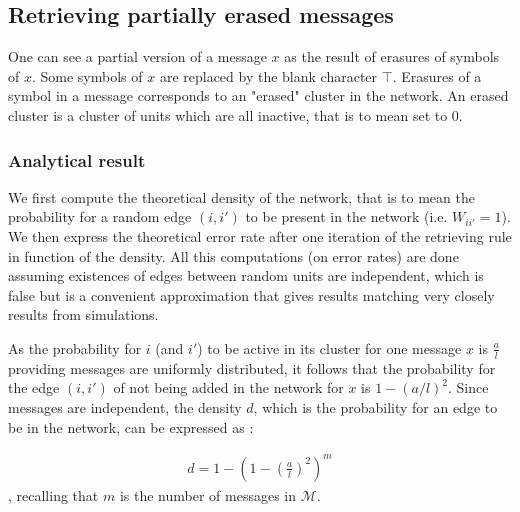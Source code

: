 \documentclass[english,10pt,twocolumn]{IEEEtran}
\theoremstyle{definition}
\begin{document}
	\subsection{Retrieving partially erased messages}		
		
	One can see a partial version of a message $x$ as the result of erasures of symbols of $x$. Some symbols of $x$ are replaced by the blank character $\intercal$.	Erasures of a symbol in a message corresponds to an "erased" cluster in the network. An erased cluster is a cluster of units which are all inactive, that is to mean set to $0$.
	
	\subsubsection{Analytical result}
	
	We first compute the theoretical density of the network, that is to mean the probability for a random edge $(i, i')$ to be present in the network (i.e. $W_{ii'} = 1$). We then express the theoretical error rate after one iteration of the retrieving rule in function of the density. All this computations (on error rates) are done assuming existences of edges between random units are independent, which is false but is a convenient approximation that gives results matching very closely results from simulations.
	
	
	
	
	
	
	
	
	

	
	
	As the probability for $i$ (and $i'$) to be active in its cluster for one message $x$ is $\frac{a}{l}$ providing messages are uniformly distributed, it follows that the probability for the edge $(i,i')$ of not being added in the network for $x$ is $1 - \left(a/l\right)^2$. Since messages are independent, the density $d$, which is the probability for an edge to be in the network, can be expressed as :
	
	\begin{align}
		\label{formula_density}
		d = 1 - \left( 1 - \left(\frac{a}{l}\right)^2 \right)^m 
	\end{align}		
	, recalling that $m$ is the number of messages in $\mathcal{M}$.
	
\end{document}
